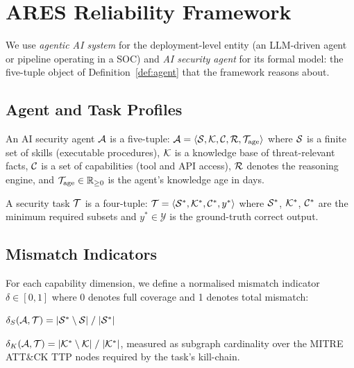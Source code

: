 \section{ARES Reliability Framework}
\label{sec:framework}

We use \textit{agentic AI system} for the deployment-level entity (an
LLM-driven agent or pipeline operating in a SOC) and \textit{AI security
agent} for its formal model: the five-tuple object of
Definition~\ref{def:agent} that the framework reasons about.

\subsection{Agent and Task Profiles}

\begin{definition}
\label{def:agent}
  An AI security agent $\mathcal{A}$ is a five-tuple:
  $\mathcal{A} = \langle \mathcal{S}, \mathcal{K}, \mathcal{C}, \mathcal{R}, \mathcal{T}_{\mathrm{age}} \rangle$
  where $\mathcal{S}$ is a finite set of skills (executable procedures),
  $\mathcal{K}$ is a knowledge base of threat-relevant facts,
  $\mathcal{C}$ is a set of capabilities (tool and API access),
  $\mathcal{R}$ denotes the reasoning engine, and
  $\mathcal{T}_{\mathrm{age}} \in \mathbb{R}_{\geq 0}$ is the agent's knowledge age in days.
\end{definition}

\begin{definition}
  A security task $\mathcal{T}$ is a four-tuple:
  $\mathcal{T} = \langle \mathcal{S}^*, \mathcal{K}^*, \mathcal{C}^*, y^* \rangle$
  where $\mathcal{S}^*$, $\mathcal{K}^*$, $\mathcal{C}^*$ are the minimum required subsets and
  $y^* \in \mathcal{Y}$ is the ground-truth correct output.
\end{definition}

\subsection{Mismatch Indicators}

For each capability dimension, we define a normalised mismatch indicator
$\delta \in [0,1]$ where 0 denotes full coverage and 1 denotes total
mismatch:

\begin{definition}
  $\delta_S(\mathcal{A}, \mathcal{T}) = |\mathcal{S}^* \setminus \mathcal{S}| \;/\; |\mathcal{S}^*|$
\end{definition}

\begin{definition}
  $\delta_K(\mathcal{A}, \mathcal{T}) = |\mathcal{K}^* \setminus \mathcal{K}| \;/\; |\mathcal{K}^*|$,
  measured as subgraph cardinality over the MITRE ATT\&CK TTP nodes
  required by the task's kill-chain.
\end{definition}

